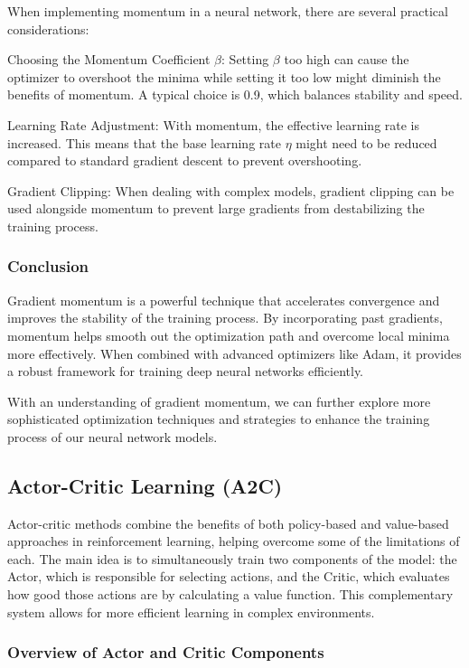 When implementing momentum in a neural network, there are several practical considerations:

Choosing the Momentum Coefficient $\beta$: Setting $\beta$ too high can cause the optimizer to overshoot the minima while setting it too low might diminish the benefits of momentum. A typical choice is 0.9, which balances stability and speed.

Learning Rate Adjustment: With momentum, the effective learning rate is increased. This means that the base learning rate $\eta$ might need to be reduced compared to standard gradient descent to prevent overshooting.

Gradient Clipping: When dealing with complex models, gradient clipping can be used alongside momentum to prevent large gradients from destabilizing the training process.

\subsubsection*{Conclusion}

Gradient momentum is a powerful technique that accelerates convergence and improves the stability of the training process. By incorporating past gradients, momentum helps smooth out the optimization path and overcome local minima more effectively. When combined with advanced optimizers like Adam, it provides a robust framework for training deep neural networks efficiently.

With an understanding of gradient momentum, we can further explore more sophisticated optimization techniques and strategies to enhance the training process of our neural network models.

\subsection*{Actor-Critic Learning (A2C)}

Actor-critic methods combine the benefits of both policy-based and value-based approaches in reinforcement learning, helping overcome some of the limitations of each. The main idea is to simultaneously train two components of the model: the Actor, which is responsible for selecting actions, and the Critic, which evaluates how good those actions are by calculating a value function. This complementary system allows for more efficient learning in complex environments.

\subsubsection*{Overview of Actor and Critic Components}

